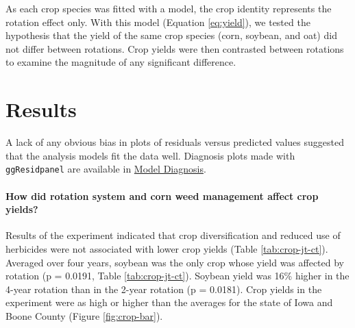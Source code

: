 \documentclass[
]{article}
\begin{document}
As each crop species was fitted with a model, the crop identity represents the rotation effect only. With this model (Equation \eqref{eq:yield}), we tested the hypothesis that the yield of the same crop species (corn, soybean, and oat) did not differ between rotations. Crop yields were then contrasted between rotations to examine the magnitude of any significant difference.

\hypertarget{results}{%
\section*{Results}\label{results}}

A lack of any obvious bias in plots of residuals versus predicted values suggested that the analysis models fit the data well. Diagnosis plots made with \texttt{ggResidpanel} \citep[version 0.3.0,][]{goodeGgResidpanelPanelsInteractive2019} are available in
\href{https://github.com/hnguyen19/Weed-community/blob/master/7-Extra/AppendixA-model-diagnosis.pdf}{Model Diagnosis}.


\hypertarget{how-did-rotation-system-and-corn-weed-management-affect-crop-yields}{%
\paragraph*{How did rotation system and corn weed management affect crop yields?}\label{how-did-rotation-system-and-corn-weed-management-affect-crop-yields}}

Results of the experiment indicated that crop diversification and reduced use of herbicides were not associated with lower crop yields (Table \ref{tab:crop-jt-ct}). Averaged over four years, soybean was the only crop whose yield was affected by rotation (p = 0.0191, Table \ref{tab:crop-jt-ct}). Soybean yield was 16\% higher in the 4-year rotation than in the 2-year rotation (p = 0.0181). Crop yields in the experiment were as high or higher than the averages for the state of Iowa and Boone County (Figure \ref{fig:crop-bar}).
\end{document}
